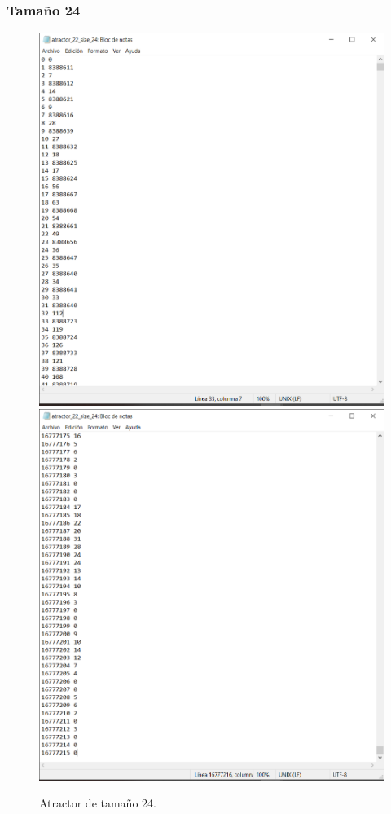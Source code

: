 \documentclass[11pt]{article}
\begin{document}
			\subsubsection{Tamaño 24}
			\begin{figure}[H]
			\centering
			\includegraphics[scale=0.3]{resources/Atractores22/atractor_22_size_24.png}
			\includegraphics[scale=0.3]{resources/Atractores22/atractor_22_size_241.png}
			\caption{Atractor de tamaño 24.}\label{fig:picture}
			\end{figure}
\end{document}
